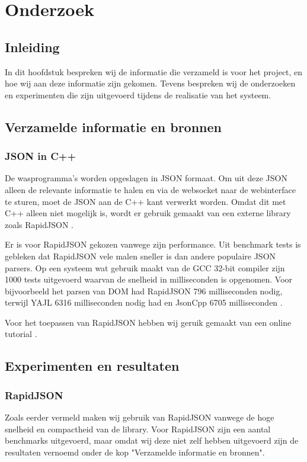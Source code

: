 \chapter{Onderzoek}
\section{Inleiding}
In dit hoofdstuk bespreken wij de informatie die verzameld is voor het project, en hoe wij aan deze informatie zijn gekomen.
Tevens bespreken wij de onderzoeken en experimenten die zijn uitgevoerd tijdens de realisatie van het systeem.
\newpage

\section{Verzamelde informatie en bronnen}
\subsection{JSON in C++}
De wasprogramma's worden opgeslagen in JSON formaat.
Om uit deze JSON alleen de relevante informatie te halen en via de websocket naar de webinterface te sturen, moet de JSON aan de C++ kant verwerkt worden.
Omdat dit met C++ alleen niet mogelijk is, wordt er gebruik gemaakt van een externe library zoals RapidJSON \cite{repo}.

Er is voor RapidJSON gekozen vanwege zijn performance. Uit benchmark tests is gebleken dat RapidJSON vele malen sneller is dan andere populaire JSON parsers.
Op een systeem wat gebruik maakt van de GCC 32-bit compiler zijn 1000 tests uitgevoerd waarvan de snelheid in milliseconden is opgenomen.
Voor bijvoorbeeld het parsen van DOM had RapidJSON 796 milliseconden nodig, terwijl YAJL 6316 milliseconden nodig had en JsonCpp 6705 milliseconden \cite{performance}.

Voor het toepassen van RapidJSON hebben wij geruik gemaakt van een online tutorial \cite{tutorial}.

\section{Experimenten en resultaten}
\subsection{RapidJSON}
Zoals eerder vermeld maken wij gebruik van RapidJSON vanwege de hoge snelheid en compactheid van de library.
Voor RapidJSON zijn een aantal benchmarks uitgevoerd, maar omdat wij deze niet zelf hebben uitgevoerd zijn de resultaten vernoemd onder de kop "Verzamelde informatie en bronnen".
